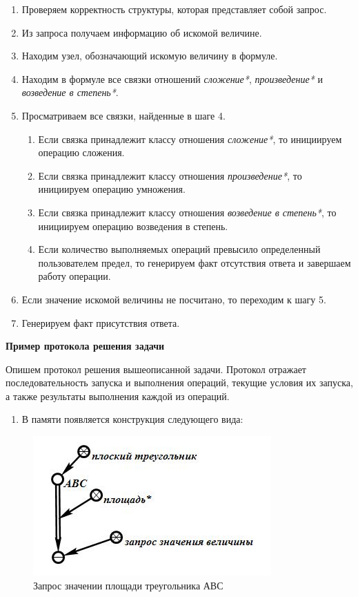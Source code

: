 \begin{enumerate}
	\item
	Проверяем корректность структуры, которая представляет собой запрос.
	\item
	Из запроса получаем информацию об искомой величине.
	\item
	Находим узел, обозначающий искомую величину в формуле.
	\item
	Находим в формуле все связки отношений \textit{сложение*}, \textit{произведение*} и \textit{возведение в степень*}.
	\item
	Просматриваем все связки, найденные в шаге 4.
	
	\begin{enumerate}
		\def\labelenumii{\arabic{enumii}.}
		\item
		Если связка принадлежит классу отношения \textit{сложение*}, то инициируем операцию сложения.
		\item
		Если связка принадлежит классу отношения \textit{произведение*}, то инициируем операцию умножения.
		\item
		Если связка принадлежит классу отношения \textit{возведение в степень*}, то инициируем операцию возведения в степень.
		\item
		Если количество выполняемых операций превысило определенный пользователем предел, то генерируем факт отсутствия ответа и завершаем работу операции.
	\end{enumerate}
	\item
	Если значение искомой величины не посчитано, то переходим к шагу 5.
	\item
	Генерируем факт присутствия ответа.
\end{enumerate}

\textbf{Пример протокола решения задачи}

Опишем протокол решения вышеописанной задачи. Протокол отражает последовательность запуска и выполнения операций, текущие условия их запуска, а также результаты выполнения каждой из операций.

\begin{enumerate}
	\item
	В памяти появляется конструкция следующего вида:
\end{enumerate}

\begin{figure}[H]
	\includegraphics[scale=0.5]{images/part7/chapter_learning_systems/step2.jpg}
	\caption{Запрос значении площади треугольника АВС}
	\label{fig:step2}
\end{figure}

